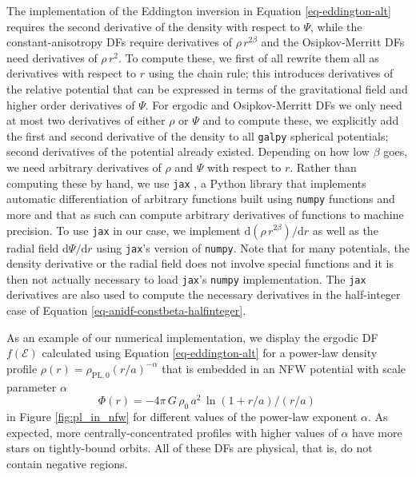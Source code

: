 The implementation of the Eddington inversion in Equation \eqref{eq-eddington-alt} requires the second derivative of the density with respect to $\Psi$, while the constant-anisotropy DFs require derivatives of $\rho\,r^{2\beta}$ and the Osipkov-Merritt DFs need derivatives of $\rho\,r^{2}$. To compute these, we first of all rewrite them all as derivatives with respect to $r$ using the chain rule; this introduces derivatives of the relative potential that can be expressed in terms of the gravitational field and higher order derivatives of $\Psi$. For ergodic and Osipkov-Merritt DFs we only need at most two derivatives of either $\rho$ or $\Psi$ and to compute these, we explicitly add the first and second derivative of the density to all \texttt{galpy} spherical potentials; second derivatives of the potential already existed. Depending on how low $\beta$ goes, we need arbitrary derivatives of $\rho$ and $\Psi$ with respect to $r$. Rather than computing these by hand, we use \texttt{jax} \citep{jax2018github}, a Python library that implements automatic differentiation of arbitrary functions built using \texttt{numpy} functions and more and that as such can compute arbitrary derivatives of functions to machine precision. To use \texttt{jax} in our case, we implement $\mathrm{d} (\rho\,r^{2\beta})/\mathrm{d} r$ as well as the radial field $\mathrm{d} \Psi / \mathrm{d}r$ using \texttt{jax}'s version of \texttt{numpy}. Note that for many potentials, the density derivative or the radial field does not involve special functions and it is then not actually necessary to load \texttt{jax}'s \texttt{numpy} implementation. The \texttt{jax} derivatives are also used to compute the necessary derivatives in the half-integer case of Equation \eqref{eq-anidf-constbeta-halfinteger}.

As an example of our numerical implementation, we display the ergodic DF $f(\mathcal{E})$ calculated using Equation \eqref{eq-eddington-alt} for a power-law density profile $\rho(r) = \rho_{\mathrm{PL},0} (r/a)^{-\alpha}$ that is embedded in an NFW potential with scale parameter $\alpha$
\begin{equation}\label{eq-nfw-pot}
\Phi(r) = -4\pi\,G\,\rho_0\,a^2\,\ln(1+r/a)/(r/a)\,
\end{equation}
in Figure \ref{fig:pl_in_nfw} for different values of the power-law exponent $\alpha$. As expected, more centrally-concentrated profiles with higher values of $\alpha$ have more stars on tightly-bound orbits. All of these DFs are physical, that is, do not contain negative regions.

